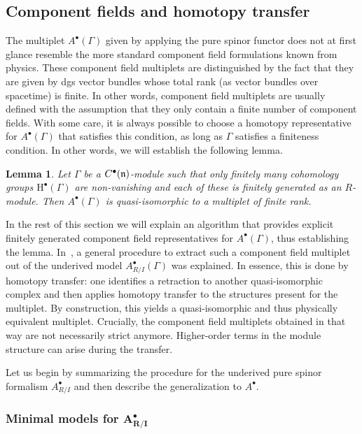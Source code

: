 \documentclass[pdftex]{sigma}
\numberwithin{equation}{section}
\newtheorem{lem}[thm]{Lemma}
\begin{document}
\subsection{Component fields and homotopy transfer} \label{sec: components}
The multiplet $A^\bullet(\Gamma)$ given by applying the pure spinor functor does not at first glance resemble the more standard component field formulations known from physics. These component field multiplets are distinguished by the fact that they are given by dgs vector bundles whose total rank (as vector bundles over spacetime) is finite. In other words, component field multiplets are usually defined with the assumption that they only contain a finite number of component fields. With some care, it is always possible to choose a homotopy representative for $A^\bullet(\Gamma)$ that satisfies this condition, as long as $\Gamma$ satisfies a finiteness condition. In other words, we will establish the following lemma.

\begin{lem} \label{fd_model_lemma}
	Let $\Gamma$ be a $C^\bullet(\mathfrak n)$-module such that only finitely many cohomology groups $\mathrm{H}^\bullet(\Gamma)$ are non-vanishing and each of these is finitely generated as an $R$-module. Then $A^\bullet(\Gamma)$ is quasi-isomorphic to a multiplet of finite rank.
\end{lem}

In the rest of this section we will explain an algorithm that provides explicit finitely generated component field representatives for $A^\bullet(\Gamma)$, thus establishing the lemma. In~\cite{perspectives}, a general procedure to extract such a component field multiplet out of the underived model $A^\bullet_{R/I}(\Gamma)$ was explained. In essence, this is done by homotopy transfer: one identifies a retraction to another quasi-isomorphic complex and then applies homotopy transfer to the structures present for the multiplet. By construction, this yields a quasi-isomorphic and thus physically equivalent multiplet. Crucially, the component field multiplets obtained in that way are not necessarily strict anymore. Higher-order terms in the module structure can arise during the transfer.

Let us begin by summarizing the procedure for the underived pure spinor formalism $A^\bullet_{R/I}$ and then describe the generalization to $A^\bullet$.

\subsubsection[Minimal models for A\^{}bullet\_\{R/I\}]{Minimal models for $\boldsymbol{A^\bullet_{R/I}}$}
\end{document}
